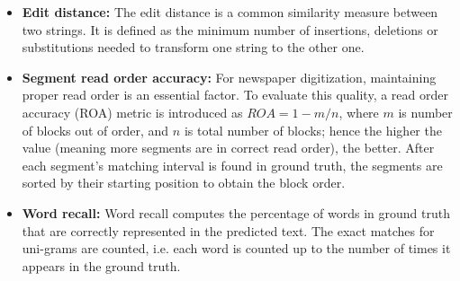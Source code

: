 \documentclass[letterpaper]{article} %
\begin{document}
\begin{itemize}
    \item \textbf{Edit distance:} The edit distance is a common similarity measure between two strings. It is defined as the minimum number of insertions, deletions or substitutions needed to transform one string to the other one.
    \item \textbf{Segment read order accuracy:} For newspaper digitization, maintaining proper read order is an essential factor. To evaluate this quality, a read order accuracy (ROA) metric is introduced as $ROA = 1 - m / n$, where $m$ is number of blocks out of order, and $n$ is total number of blocks; hence the higher the value (meaning more segments are in correct read order), the better. After each segment's matching interval is found in ground truth, the segments are sorted by their starting position to obtain the block order.
    \item \textbf{Word recall:} Word recall computes the percentage of words in ground truth that are correctly represented in the predicted text. The exact matches for uni-grams are counted, i.e.  each word is counted up to the number of times it appears in the ground truth. 
\end{itemize}
\end{document}
